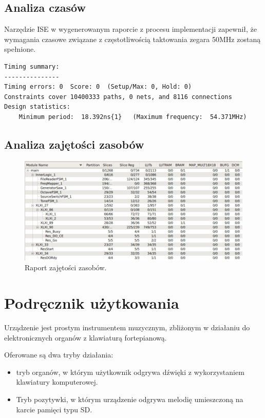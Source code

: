 \documentclass[a4paper,12pt]{article}
\begin{document}
\subsection{Analiza czasów}
Narzędzie ISE w wygenerowanym raporcie z procesu implementacji zapewnił, że wymagania czasowe związane z częstotliwością taktowania zegara 50MHz zostaną spełnione.
\begin{lstlisting}
Timing summary: 
--------------- 
Timing errors: 0  Score: 0  (Setup/Max: 0, Hold: 0) 
Constraints cover 10400333 paths, 0 nets, and 8116 connections 
Design statistics: 
    Minimum period:  18.392ns{1}   (Maximum frequency:  54.371MHz) 
\end{lstlisting}

\subsection{Analiza zajętości zasobów}
\begin{figure}[H]
  \centering
  \includegraphics[width=\linewidth]{images/area}
  \caption{Raport zajętości zasobów.}
  \label{hardware}
\end{figure}

\clearpage
\section{Podręcznik użytkowania}
Urządzenie jest prostym instrumentem muzycznym, zbliżonym w działaniu do elektronicznych organów z klawiaturą fortepianową.

Oferowane są dwa tryby działania: 
\begin{itemize}
  \item tryb organów, w którym użytkownik odgrywa dźwięki z wykorzystaniem klawiatury komputerowej.
  \item Tryb pozytywki, w którym urządzenie odgrywa melodię umieszczoną na karcie pamięci typu SD.
\end{itemize}
 
\end{document}
